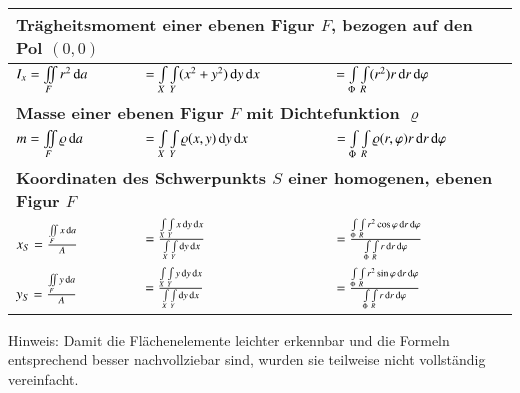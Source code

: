 {\begin{tabular}{|l|l|l|}
        \multicolumn{3}{|l|}{\bf{Trägheitsmoment einer ebenen Figur $F$, bezogen auf den Pol $(0, 0)$}} \\\hline
        $ I_x = \iint\limits_{F} r^2 \mathop{} \! \mathrm{d} a $ & 
        $ = \int\limits_{X}\int\limits_{Y} (x^2 + y^2) \mathop{} \! \mathrm{d} y \mathop{} \! \mathrm{d} x $ &
        $ = \int\limits_{\Phi}\int\limits_{R} (r^2) r \mathop{} \! \mathrm{d} r \mathop{} \! \mathrm{d} \varphi $ \\\hline

        \multicolumn{3}{|l|}{\bf{Masse einer ebenen Figur $F$ mit Dichtefunktion $\varrho$}} \\\hline
        $ m = \iint\limits_{F} \varrho \mathop{} \! \mathrm{d} a $ & 
        $ = \int\limits_{X}\int\limits_{Y} \varrho (x, y) \mathop{} \! \mathrm{d} y \mathop{} \! \mathrm{d} x $ &
        $ = \int\limits_{\Phi}\int\limits_{R} \varrho (r, \varphi) r \mathop{} \! \mathrm{d} r \mathop{} \! \mathrm{d} \varphi $ \\\hline

        \multicolumn{3}{|l|}{\bf{Koordinaten des Schwerpunkts $S$ einer homogenen, ebenen Figur $F$}} \\\hline
        $ x_{S} = \frac{\iint\limits_{F} x \mathop{} \! \mathrm{d} a}{A} $ & 
        $ = \frac{\int\limits_{X}\int\limits_{Y} x \mathop{} \! \mathrm{d} y \mathop{} \! \mathrm{d} x}{\int\limits_{X}\int\limits_{Y} \mathop{} \! \mathrm{d} y \mathop{} \! \mathrm{d} x} $ &
        $ = \frac{\int\limits_{\Phi}\int\limits_{R} r^2 \cos \varphi \mathop{} \! \mathrm{d} r \mathop{} \! \mathrm{d} \varphi}{\int\limits_{\Phi}\int\limits_{R} r \mathop{} \! \mathrm{d} r \mathop{} \! \mathrm{d} \varphi} $ \\
        $ y_{S} = \frac{\iint\limits_{F} y \mathop{} \! \mathrm{d} a}{A} $ & 
        $ = \frac{\int\limits_{X}\int\limits_{Y} y \mathop{} \! \mathrm{d} y \mathop{} \! \mathrm{d} x}{\int\limits_{X}\int\limits_{Y} \mathop{} \! \mathrm{d} y \mathop{} \! \mathrm{d} x} $ &
        $ = \frac{\int\limits_{\Phi}\int\limits_{R} r^2 \sin \varphi \mathop{} \! \mathrm{d} r \mathop{} \! \mathrm{d} \varphi}{\int\limits_{\Phi}\int\limits_{R} r \mathop{} \! \mathrm{d} r \mathop{} \! \mathrm{d} \varphi} $ \\\hline
    \end{tabular}
}

\smallskip
Hinweis: Damit die Flächenelemente leichter erkennbar und die Formeln entsprechend besser nachvollziebar sind, wurden sie teilweise nicht vollständig vereinfacht.
